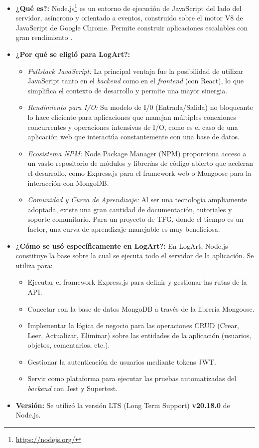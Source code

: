 \begin{itemize}
    \item \textbf{¿Qué es?:} Node.js\footnote{\url{https://nodejs.org/}} es un entorno de ejecución de JavaScript del lado del servidor, asíncrono y orientado a eventos, construido sobre el motor V8 de JavaScript de Google Chrome. Permite construir aplicaciones escalables con gran rendimiento \cite{kinstaQueEsNodeJS}.

    \item \textbf{¿Por qué se eligió para LogArt?:}
        \begin{itemize}
            \item \textit{Fullstack JavaScript:} La principal ventaja fue la posibilidad de utilizar JavaScript tanto en el \textit{backend} como en el \textit{frontend} (con React), lo que simplifica el contexto de desarrollo y permite una mayor sinergia.
            \item \textit{Rendimiento para I/O:} Su modelo de I/0 (Entrada/Salida) no bloqueante lo hace eficiente para aplicaciones que manejan múltiples conexiones concurrentes y operaciones intensivas de I/O, como es el caso de una aplicación web que interactúa constantemente con una base de datos.
            \item \textit{Ecosistema NPM:} Node Package Manager (NPM) proporciona acceso a un vasto repositorio de módulos y librerías de código abierto que aceleran el desarrollo, como Express.js para el framework web o Mongoose para la interacción con MongoDB.
            \item \textit{Comunidad y Curva de Aprendizaje:} Al ser una tecnología ampliamente adoptada, existe una gran cantidad de documentación, tutoriales y soporte comunitario. Para un proyecto de TFG, donde el tiempo es un factor, una curva de aprendizaje manejable es muy beneficiosa.
        \end{itemize}
    \item \textbf{¿Cómo se usó específicamente en LogArt?:}
    En LogArt, Node.js constituye la base sobre la cual se ejecuta todo el servidor de la aplicación. Se utiliza para:
        \begin{itemize}
            \item Ejecutar el framework Express.js para definir y gestionar las rutas de la API.
            \item Conectar con la base de datos MongoDB a través de la librería Mongoose.
            \item Implementar la lógica de negocio para las operaciones CRUD (Crear, Leer, Actualizar, Eliminar) sobre las entidades de la aplicación (usuarios, objetos, comentarios, etc.).
            \item Gestionar la autenticación de usuarios mediante tokens JWT.
            \item Servir como plataforma para ejecutar las pruebas automatizadas del \textit{backend} con Jest y Supertest.
        \end{itemize}
    \item \textbf{Versión:} Se utilizó la versión LTS (Long Term Support) \textbf{v20.18.0} de Node.js.
\end{itemize}

